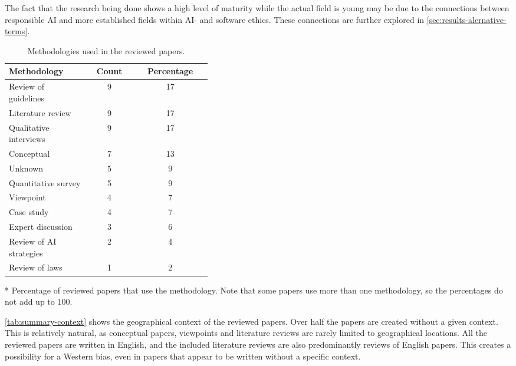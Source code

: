 The fact that the research being done shows a high level of maturity while the actual field is young may be due to the connections between responsible AI and more established fields within AI- and software ethics. These connections are further explored in \autoref{sec:results-alernative-terms}.

\begin{table}[ht]
    \centering
    \caption{Methodologies used in the reviewed papers.}
    \label{tab:summary-methodology}
    \begin{threeparttable}
    \begin{tabular}{p{0.4\linewidth}cc}
    \toprule
        \textbf{Methodology} & \textbf{Count} & \textbf{Percentage}\tnote{*} \\
    \midrule
        Review of guidelines    & 9     & 17  \\
        Literature review       & 9     & 17  \\
        Qualitative interviews  & 9     & 17  \\
        Conceptual              & 7     & 13  \\
        Unknown                 & 5     & 9   \\
        Quantitative survey     & 5     & 9   \\
        Viewpoint               & 4     & 7   \\
        Case study              & 4     & 7   \\
        Expert discussion       & 3     & 6   \\
        Review of AI strategies & 2     & 4   \\
        Review of laws          & 1     & 2   \\
    \bottomrule
    \end{tabular}
    \begin{tablenotes}
        \footnotesize
        \item [*] Percentage of reviewed papers that use the methodology. Note that some papers use more than one methodology, so the percentages do not add up to 100.
    \end{tablenotes}
\end{threeparttable}
\end{table}

\autoref{tab:summary-context} shows the geographical context of the reviewed papers. Over half the papers are created without a given context. This is relatively natural, as conceptual papers, viewpoints and literature reviews are rarely limited to geographical locations. All the reviewed papers are written in English, and the included literature reviews are also predominantly reviews of English papers. This creates a possibility for a Western bias, even in papers that appear to be written without a specific context.

